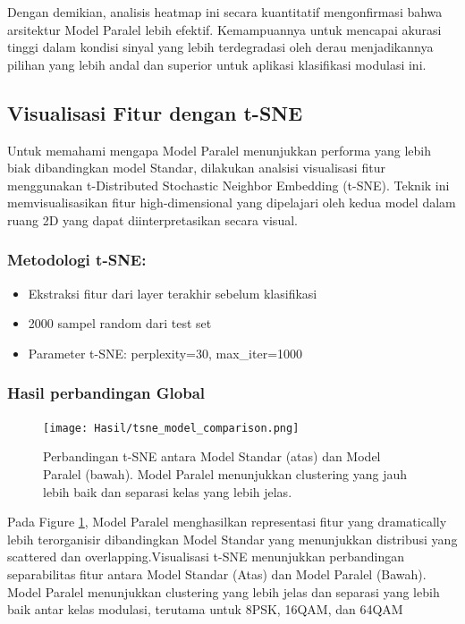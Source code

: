 \documentclass{article}
\begin{document}
Dengan demikian, analisis heatmap ini secara kuantitatif mengonfirmasi bahwa arsitektur Model Paralel lebih efektif. Kemampuannya untuk mencapai 
akurasi tinggi dalam kondisi sinyal yang lebih terdegradasi oleh derau menjadikannya pilihan yang lebih andal dan superior untuk aplikasi klasifikasi modulasi ini.


\subsection{Visualisasi Fitur dengan t-SNE} 
Untuk memahami mengapa Model Paralel menunjukkan performa yang lebih biak dibandingkan model Standar, dilakukan analsisi visualisasi fitur 
menggunakan t-Distributed Stochastic Neighbor Embedding (t-SNE). Teknik ini memvisualisasikan fitur high-dimensional yang dipelajari oleh 
kedua model dalam ruang 2D yang dapat diinterpretasikan secara visual. 

\subsubsection{\textbf{Metodologi t-SNE:}}
\begin{itemize}
    \item Ekstraksi fitur dari layer terakhir sebelum klasifikasi
    \item 2000 sampel random dari test set
    \item Parameter t-SNE: perplexity=30, max\_iter=1000
\end{itemize}

\subsubsection{\textbf{Hasil perbandingan Global}}
\begin{figure}[H]
\centerline{\texttt{[image: Hasil/tsne\_model\_comparison.png]}}
\caption{Perbandingan t-SNE antara Model Standar (atas) dan Model Paralel (bawah). Model Paralel menunjukkan clustering yang jauh lebih baik dan separasi kelas yang lebih jelas.}
\label{fig:tsne_global}
\end{figure} 
Pada Figure \ref{fig:tsne_global}, Model Paralel menghasilkan representasi fitur yang dramatically lebih terorganisir 
dibandingkan Model Standar yang menunjukkan distribusi yang scattered dan overlapping.Visualisasi t-SNE menunjukkan perbandingan 
separabilitas fitur antara Model Standar (Atas) dan Model Paralel (Bawah). Model Paralel menunjukkan clustering yang lebih jelas 
dan separasi yang lebih baik antar kelas modulasi, terutama untuk 8PSK, 16QAM, dan 64QAM
\end{document}
